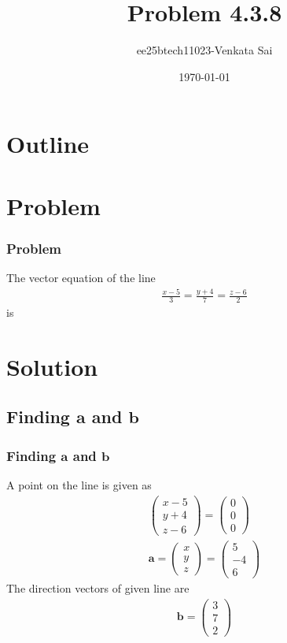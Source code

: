 \documentclass{beamer}
\title{Problem 4.3.8}
\author{ee25btech11023-Venkata Sai}
\date{\today}
\theoremstyle{remark}
\newcommand{\myvec}[1]{\ensuremath{\begin{pmatrix}#1\end{pmatrix}}}
\let\vec\mathbf
\numberwithin{equation}{section}
\begin{document}
\begin{frame}
\titlepage
\end{frame}

\section*{Outline}
\begin{frame}
\tableofcontents
\end{frame}

\section{Problem}

\begin{frame}
\frametitle{Problem}
\setcounter{section}{1}
 The vector equation of the line
\begin{align}
\frac{x-5}{3} = \frac{y+4}{7} = \frac{z-6}{2}
\end{align}
is
\end{frame}
\section{Solution}

\subsection{Finding $\vec{a}$ and $\vec{b}$}
\begin{frame}
\frametitle{Finding $\vec{a}$ and $\vec{b}$}
A point on the line  is given as
\begin{align}
\myvec{x-5 \\y+4 \\z-6}=\myvec{0\\0\\0}\\
\vec{a}=\myvec{x\\y\\z}=\myvec{5\\-4\\6}
\end{align}
The direction vectors of given line are
\begin{align}
    \vec{b}=\myvec{3\\7\\2}
\end{align}
\end{frame}
\end{document}
